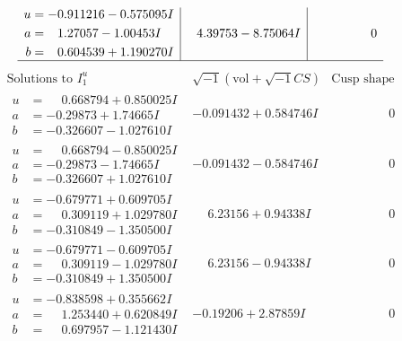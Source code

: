 \documentclass[1p]{elsarticle_modified}
\theoremstyle{definition}
\newcommand{\I}{\sqrt{-1}}
\begin{document}
$$\begin{array}{c|c|c}
\begin{aligned}
u &= -0.911216 - 0.575095 I \\
a &= \phantom{-}1.27057 - 1.00453 I \\
b &= \phantom{-}0.604539 + 1.190270 I\end{aligned}
 & \phantom{-}4.39753 - 8.75064 I & \phantom{-0.000000 } 0\\
 \hline 
 \end{array}$$\newpage$$\begin{array}{c|c|c}  
\text{Solutions to }I^u_{1}& \I (\text{vol} + \sqrt{-1}CS) & \text{Cusp shape}\\
 \hline 
\begin{aligned}
u &= \phantom{-}0.668794 + 0.850025 I \\
a &= -0.29873 + 1.74665 I \\
b &= -0.326607 - 1.027610 I\end{aligned}
 & -0.091432 + 0.584746 I & \phantom{-0.000000 } 0 \\ \hline\begin{aligned}
u &= \phantom{-}0.668794 - 0.850025 I \\
a &= -0.29873 - 1.74665 I \\
b &= -0.326607 + 1.027610 I\end{aligned}
 & -0.091432 - 0.584746 I & \phantom{-0.000000 } 0 \\ \hline\begin{aligned}
u &= -0.679771 + 0.609705 I \\
a &= \phantom{-}0.309119 + 1.029780 I \\
b &= -0.310849 - 1.350500 I\end{aligned}
 & \phantom{-}6.23156 + 0.94338 I & \phantom{-0.000000 } 0 \\ \hline\begin{aligned}
u &= -0.679771 - 0.609705 I \\
a &= \phantom{-}0.309119 - 1.029780 I \\
b &= -0.310849 + 1.350500 I\end{aligned}
 & \phantom{-}6.23156 - 0.94338 I & \phantom{-0.000000 } 0 \\ \hline\begin{aligned}
u &= -0.838598 + 0.355662 I \\
a &= \phantom{-}1.253440 + 0.620849 I \\
b &= \phantom{-}0.697957 - 1.121430 I\end{aligned}
 & -0.19206 + 2.87859 I & \phantom{-0.000000 } 0 \\ \hline\begin{aligned}

\end{aligned}
\end{array}$$
\end{document}
